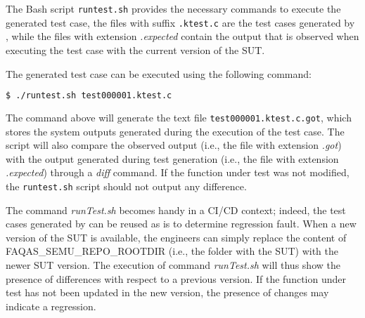 The Bash script \texttt{runtest.sh} provides the necessary commands to execute the generated test case, the files with suffix \texttt{.ktest.c}  are the test cases generated by \SEMUS, while the files with extension \emph{.expected} contain the output that is observed when executing the test case with the current version of the SUT.

The generated test case can be executed using the following command:

\begin{lstlisting}[language=bash]
 $ ./runtest.sh test000001.ktest.c
\end{lstlisting}

The command above will generate the text file \texttt{test000001.ktest.c.got}, which stores the system outputs generated during the execution of the test case. The script will also compare the observed output (i.e., the file with extension \emph{.got}) with the output generated during test generation (i.e., the file with extension \emph{.expected}) through a \emph{diff} command. If the function under test was not modified, the \texttt{runtest.sh} script should not output any difference. 


The command \emph{runTest.sh} becomes handy in a CI/CD context; indeed, the test cases generated by \SEMUS can be reused as is to determine regression fault. When a new version of the SUT is available, the engineers can simply replace the content of FAQAS\_SEMU\_REPO\_ROOTDIR (i.e., the folder with the SUT) with the newer SUT version. The execution of 
command \emph{runTest.sh} will thus show the presence of differences with respect to a previous version. If the function under test has not been updated in the new version, the presence of changes may indicate a regression.